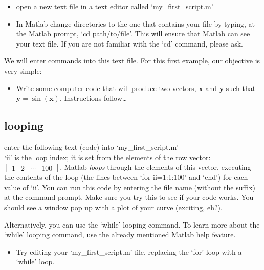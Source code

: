 \documentclass[letter]{article}
\begin{document}
\begin{itemize}
\item open a new text file in a text editor called
  `my\_first\_script.m'
\item In Matlab change directories to the one that contains your
  file by typing, at the Matlab prompt, `cd path/to/file'.  This will
  ensure that Matlab can see your text file.  If you are not familiar
  with the `cd' command, please ask.
\end{itemize}

We will enter commands into this text file.  For this first example,
our objective is very simple:

\begin{itemize}
\item Write some computer code that will produce two vectors,
  $\mathbf{x}$ and $\mathbf{y}$ such that
  $\mathbf{y}=\sin(\mathbf{x})$. Instructions 
  follow\ldots
\end{itemize}



\subsection*{looping}

enter the following text (code) into `my\_first\_script.m' \\



`ii' is the loop index; it is set from the elements of the row vector:
$\left[\begin{array}{ccccc} 1 & 2 & \cdots & 100 \end{array}\right]$.
Matlab \emph{loops} through the elements of this vector, executing the
contents of the loop (the lines between `for ii=1:1:100' and `end')
for each value of `ii'.  You can run this code by entering the file
name (without the suffix) at the command
prompt.  Make sure you try this to see if your code works.  You should
see a window pop up with a plot of your curve (exciting, eh?).

Alternatively, you can use the `while' looping command.  To
learn more about the `while' looping command, use the already
mentioned Matlab help feature.

\begin{itemize}
\item Try editing your `my\_first\_script.m' file, replacing the `for' loop
with a `while' loop.
\end{itemize}
\end{document}

